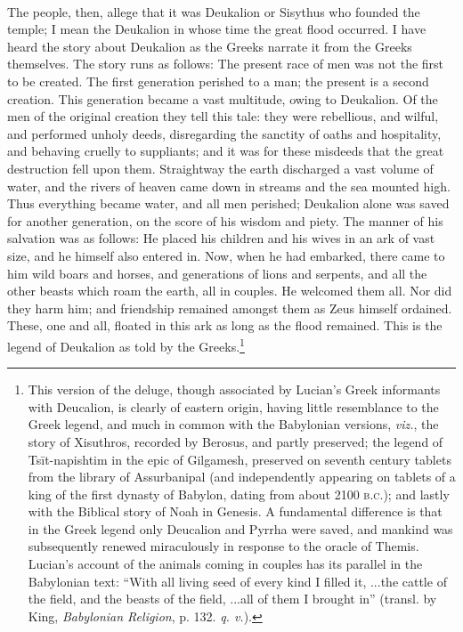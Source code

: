 \documentclass[a4paper, 11pt, oneside, polutonikogreek, english]{article}
\begin{document}
\paragraph{}
The people, then, allege that it was Deukalion or Sisythus who founded the temple; I mean the Deukalion in whose time the great flood occurred. I have heard the story about Deukalion as the Greeks narrate it from the Greeks themselves. The story runs as follows: The present race of men was not the first to be created. The first generation perished to a man; the present is a second creation. This generation became a vast multitude, owing to Deukalion. Of the men of the original creation they tell this tale: they were rebellious, and wilful, and performed unholy deeds, disregarding the sanctity of oaths and hospitality, and behaving cruelly to suppliants; and it was for these misdeeds that the great destruction fell upon them. Straightway the earth discharged a vast volume of water, and the rivers of heaven came down in streams and the sea mounted high. Thus everything became water, and all men perished; Deukalion alone was saved for another generation, on the score of his wisdom and piety. The manner of his salvation was as follows: He placed his children and his wives in an ark of vast size, and he himself also entered in. Now, when he had embarked, there came to him wild boars and horses, and generations of lions and serpents, and all the other beasts which roam the earth, all in couples. He welcomed them all. Nor did they harm him; and friendship remained amongst them as Zeus himself ordained. These, one and all, floated in this ark as long as the flood remained. This is the legend of Deukalion as told by the Greeks.\footnote{This version of the deluge, though associated by Lucian's Greek informants with Deucalion, is clearly of eastern origin, having little resemblance to the Greek legend, and much in common with the Babylonian versions, \emph{viz.}, the story of Xisuthros, recorded by Berosus, and partly preserved; the legend of Tsīt-napishtim in the epic of Gilgamesh, preserved on seventh century tablets from the library of Assurbanipal (and independently appearing on tablets of a king of the first dynasty of Babylon, dating from about 2100 \textsc{b.c.}); and lastly with the Biblical story of Noah in Genesis. A fundamental difference is that in the Greek legend only Deucalion and Pyrrha were saved, and mankind was subsequently renewed miraculously in response to the oracle of Themis. Lucian's account of the animals coming in couples has its parallel in the Babylonian text: ``With all living seed of every kind I filled it, ...the cattle of the field, and the beasts of the field, ...all of them I brought in'' (transl. by King, \emph{Babylonian Religion}, p. 132. \emph{q. v.}).}
\end{document}

